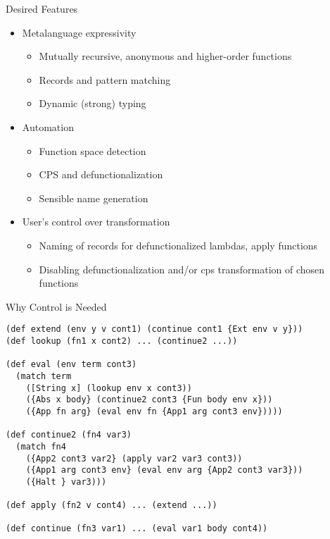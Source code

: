 \documentclass[handout]{beamer}
\begin{document}
\begin{frame}{Desired Features}
  \begin{itemize}
    \item Metalanguage expressivity \pause
    \begin{itemize}
      \item Mutually recursive, anonymous and higher-order functions \pause
      \item Records and pattern matching \pause
      \item Dynamic (strong) typing \pause
    \end{itemize}\pause
    \item Automation \pause
    \begin{itemize}
      \item Function space detection\pause
      \item CPS and defunctionalization\pause
      \item Sensible name generation
    \end{itemize}\pause
    \item User's control over transformation\pause
    \begin{itemize}
      \item Naming of records for defunctionalized lambdas, apply functions\pause
      \item Disabling defunctionalization and/or cps transformation of chosen functions \pause
    \end{itemize}
  \end{itemize}
\end{frame}

\begin{frame}[fragile]{Why Control is Needed}
  \begin{lstlisting}
(def extend (env y v cont1) (continue cont1 {Ext env v y}))
(def lookup (fn1 x cont2) ... (continue2 ...))

(def eval (env term cont3)
  (match term
    ([String x] (lookup env x cont3))
    ({Abs x body} (continue2 cont3 {Fun body env x}))
    ({App fn arg} (eval env fn {App1 arg cont3 env}))))

(def continue2 (fn4 var3)
  (match fn4
    ({App2 cont3 var2} (apply var2 var3 cont3))
    ({App1 arg cont3 env} (eval env arg {App2 cont3 var3}))
    ({Halt } var3)))

(def apply (fn2 v cont4) ... (extend ...))

(def continue (fn3 var1) ... (eval var1 body cont4))
  \end{lstlisting}
\end{frame}
\end{document}
